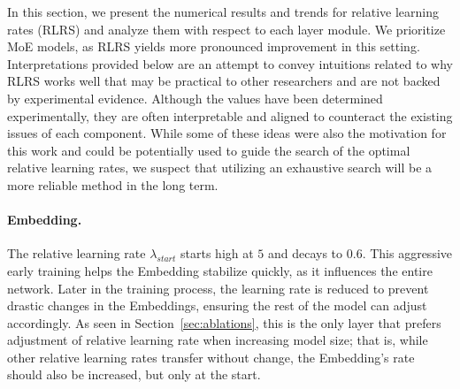 \documentclass{article} %
\newcommand{\jl}[1]{\textcolor{green}{[JL: #1]}}
\begin{document}







    In this section, we present the numerical results and trends for relative learning rates (RLRS) and analyze them with respect to each layer module. We prioritize MoE models, as RLRS yields more pronounced improvement in this setting.  Interpretations provided below are an attempt to convey intuitions related to why RLRS works well that may be practical to other researchers and are not backed by experimental evidence. Although the values have been determined experimentally, they are often interpretable and aligned to counteract the existing issues of each component. While some of these ideas were also the motivation for this work and could be potentially used to guide the search of the optimal relative learning rates, we suspect that utilizing an exhaustive search will be a more reliable method in the long term.

    \paragraph{Embedding.} The relative learning rate $\lambda_{\textit{start}}$ starts high at $5$ and decays to $0.6$. This aggressive early training helps the Embedding stabilize quickly, as it influences the entire network. Later in the training process, the learning rate is reduced to prevent drastic changes in the Embeddings, ensuring the rest of the model can adjust accordingly. As seen in Section~\ref{sec:ablations}, this is the only layer that prefers adjustment of relative learning rate when increasing model size; that is, while other relative learning rates transfer without change, the Embedding's rate should also be increased, but only at the start.
\end{document}
